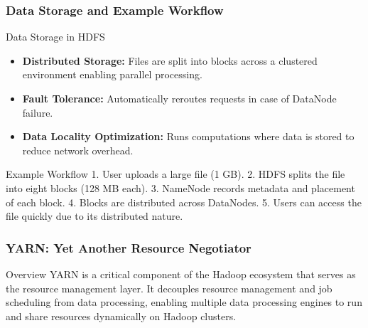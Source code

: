 \documentclass[aspectratio=169]{beamer}
\begin{document}
\begin{frame}[fragile]
    \frametitle{Data Storage and Example Workflow}
    \begin{block}{Data Storage in HDFS}
        \begin{itemize}
            \item \textbf{Distributed Storage:} Files are split into blocks across a clustered environment enabling parallel processing.
            \item \textbf{Fault Tolerance:} Automatically reroutes requests in case of DataNode failure.
            \item \textbf{Data Locality Optimization:} Runs computations where data is stored to reduce network overhead.
        \end{itemize}
    \end{block}
    
    \begin{block}{Example Workflow}
        1. User uploads a large file (1 GB).
        2. HDFS splits the file into eight blocks (128 MB each).
        3. NameNode records metadata and placement of each block.
        4. Blocks are distributed across DataNodes.
        5. Users can access the file quickly due to its distributed nature.
    \end{block}
\end{frame}

\begin{frame}[fragile]
    \frametitle{YARN: Yet Another Resource Negotiator}
    \begin{block}{Overview}
        YARN is a critical component of the Hadoop ecosystem that serves as the resource management layer. It decouples resource management and job scheduling from data processing, enabling multiple data processing engines to run and share resources dynamically on Hadoop clusters.
    \end{block}
\end{frame}
\end{document}
